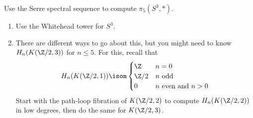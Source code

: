 \begin{exercise}
	Use the Serre spectral sequence to compute $\pi_5(S^3, *)$.
	\begin{hint}
		\leavevmode
		\begin{enumerate}
			\item Use the Whitehead tower for $S^3$.
			\item There are different ways to go about this, but you might need to know $H_n(K(\Zn{2}, 3))$ for $n \leq 5$.
				For this, recall that
				\begin{equation*}
					H_n(K(\Zn{2}, 1)) \isom \begin{cases}
						\Z 		& n = 0 \\
						\Zn{2} 	& n \text{ odd} \\
						0 		& n \text{ even and } n > 0 \\
					\end{cases}
				\end{equation*}
				Start with the path-loop fibration of $K(\Zn{2}, 2)$ to compute $H_n(K(\Zn{2}, 2))$ in low degrees, then do the same for $K(\Zn{2}, 3)$.
		\end{enumerate}
	\end{hint}
\end{exercise}

